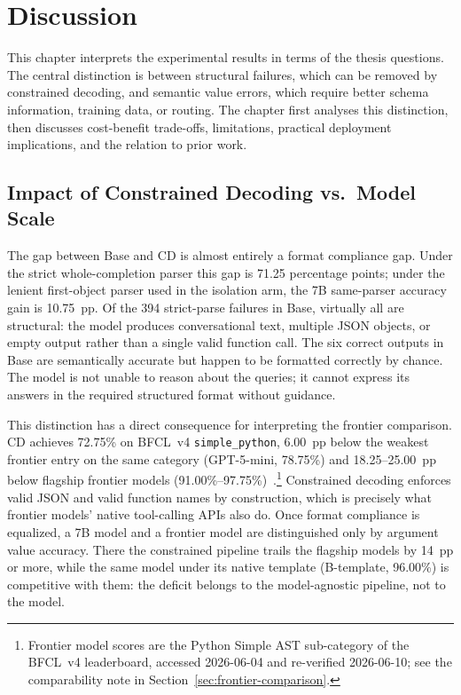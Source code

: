 \chapter{Discussion} \label{ch:discussion}

This chapter interprets the experimental results in terms of the thesis
questions. The central distinction is between structural failures, which can
be removed by constrained decoding, and semantic value errors, which require
better schema information, training data, or routing. The chapter first
analyses this distinction, then discusses cost-benefit trade-offs, limitations,
practical deployment implications, and the relation to prior work.

\section{Impact of Constrained Decoding vs.\ Model Scale}

The gap between Base and CD is almost entirely a format compliance gap. Under
the strict whole-completion parser this gap is 71.25 percentage points; under
the lenient first-object parser used in the isolation arm, the 7B same-parser
accuracy gain is 10.75~pp. Of the 394 strict-parse failures in Base, virtually
all are structural: the model produces conversational text, multiple JSON
objects, or empty output rather than a single valid function call. The six
correct outputs in Base are semantically accurate but happen to be formatted
correctly by chance. The model is not unable to reason about the queries; it
cannot express its answers in the required structured format without guidance.

This distinction has a direct consequence for interpreting the frontier
comparison. CD achieves 72.75\% on BFCL~v4 \texttt{simple\_python},
6.00~pp below the weakest frontier entry on the same category (GPT-5-mini,
78.75\%) and 18.25--25.00~pp below flagship frontier models
(91.00\%--97.75\%)~\cite{bfcl2024}.\footnote{Frontier model scores are the Python Simple AST sub-category of the BFCL~v4 leaderboard, accessed 2026-06-04 and re-verified 2026-06-10; see the comparability note in Section~\ref{sec:frontier-comparison}.} Constrained decoding enforces valid JSON and valid function
names by construction, which is precisely what frontier models' native
tool-calling APIs also do. Once format compliance is equalized, a 7B model
and a frontier model are distinguished only by argument value accuracy.
There the constrained pipeline trails the flagship models by 14~pp or
more, while the same model under its native template (B-template, 96.00\%)
is competitive with them: the deficit belongs to the model-agnostic
pipeline, not to the model.

